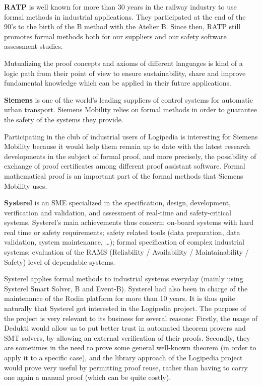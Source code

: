 {{\bf RATP} is well known for more than 30 years in the railway
industry to use formal methods in industrial applications. They
participated at the end of the 90's to the birth of the B method with
the Atelier B. Since then, RATP still promotes formal methods both for
our suppliers and our safety software assessment studies.

Mutualizing the proof concepts and axioms of different languages is
kind of a logic path from their point of view to ensure
sustainability, share and improve fundamental knowledge which can be
applied in their future applications.

{\bf Siemens} is one of the world's leading suppliers of control
systems for automatic urban transport. Siemens Mobility relies on
formal methods in order to guarantee the safety of the systems they
provide.

Participating in the club of industrial users of Logipedia is
interesting for Siemens Mobility because it would help them remain up
to date with the latest research developments in the subject of formal
proof, and more precisely, the possibility of exchange of proof
certificates among different proof assistant software. Formal
mathematical proof is an important part of the formal methods that
Siemens Mobility uses.

{\bf Systerel} is an SME specialized in the specification, design,
development, verification and validation, and assessment of real-time
and safety-critical systems. Systerel's main achievements thus
concern: on-board systems with hard real time or safety requirements;
safety related tools (data preparation, data validation, system
maintenance, \ldots); formal specification of complex industrial
systems; evaluation of the RAMS (Reliability / Availability /
Maintainability / Safety) level of dependable systems.

Systerel applies formal methods to industrial systems everyday (mainly
using Systerel Smart Solver, B and Event-B). Systerel had also been in
charge of the maintenance of the Rodin platform for more than 10
years. It is thus quite naturally that Systerel got interested in the
Logipedia project. The purpose of the project is very relevant to its
business for several reasons: Firstly, the usage of Dedukti would
allow us to put better trust in automated theorem provers and SMT
solvers, by allowing an external verification of their
proofs. Secondly, they are sometimes in the need to prove some general
well-known theorem (in order to apply it to a specific case), and the
library approach of the Logipedia project would prove very useful by
permitting proof reuse, rather than having to carry one again a manual
proof (which can be quite costly).

}
